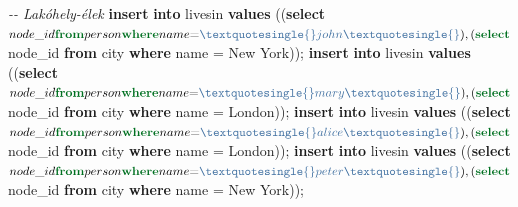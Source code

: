 \documentclass[
  magyar,
]{article}
\newenvironment{Shaded}{}{}
\newcommand{\CommentTok}[1]{\textcolor[rgb]{0.38,0.63,0.69}{\textit{#1}}}
\newcommand{\KeywordTok}[1]{\textcolor[rgb]{0.00,0.44,0.13}{\textbf{#1}}}
\newcommand{\NormalTok}[1]{#1}
\newcommand{\OperatorTok}[1]{\textcolor[rgb]{0.40,0.40,0.40}{#1}}
\newcommand{\StringTok}[1]{\textcolor[rgb]{0.25,0.44,0.63}{#1}}
\begin{document}
\begin{Shaded}
\begin{Highlighting}[]
\CommentTok{{-}{-} Lakóhely{-}élek}
\KeywordTok{insert} \KeywordTok{into}\NormalTok{ livesin }\KeywordTok{values}
\NormalTok{ ((}\KeywordTok{select}\NormalTok{ $node\_id }\KeywordTok{from}\NormalTok{ person }\KeywordTok{where}\NormalTok{ name }\OperatorTok{=} \StringTok{\textquotesingle{}john\textquotesingle{}}\NormalTok{),}
\NormalTok{ (}\KeywordTok{select}\NormalTok{ $node\_id }\KeywordTok{from}\NormalTok{ city }\KeywordTok{where}\NormalTok{ name }\OperatorTok{=} \StringTok{\textquotesingle{}New York\textquotesingle{}}\NormalTok{));}
\KeywordTok{insert} \KeywordTok{into}\NormalTok{ livesin }\KeywordTok{values}
\NormalTok{ ((}\KeywordTok{select}\NormalTok{ $node\_id }\KeywordTok{from}\NormalTok{ person }\KeywordTok{where}\NormalTok{ name }\OperatorTok{=} \StringTok{\textquotesingle{}mary\textquotesingle{}}\NormalTok{),}
\NormalTok{ (}\KeywordTok{select}\NormalTok{ $node\_id }\KeywordTok{from}\NormalTok{ city }\KeywordTok{where}\NormalTok{ name }\OperatorTok{=} \StringTok{\textquotesingle{}London\textquotesingle{}}\NormalTok{));}
\KeywordTok{insert} \KeywordTok{into}\NormalTok{ livesin }\KeywordTok{values}
\NormalTok{ ((}\KeywordTok{select}\NormalTok{ $node\_id }\KeywordTok{from}\NormalTok{ person }\KeywordTok{where}\NormalTok{ name }\OperatorTok{=} \StringTok{\textquotesingle{}alice\textquotesingle{}}\NormalTok{),}
\NormalTok{ (}\KeywordTok{select}\NormalTok{ $node\_id }\KeywordTok{from}\NormalTok{ city }\KeywordTok{where}\NormalTok{ name }\OperatorTok{=} \StringTok{\textquotesingle{}London\textquotesingle{}}\NormalTok{));}
\KeywordTok{insert} \KeywordTok{into}\NormalTok{ livesin }\KeywordTok{values}
\NormalTok{ ((}\KeywordTok{select}\NormalTok{ $node\_id }\KeywordTok{from}\NormalTok{ person }\KeywordTok{where}\NormalTok{ name }\OperatorTok{=} \StringTok{\textquotesingle{}peter\textquotesingle{}}\NormalTok{),}
\NormalTok{ (}\KeywordTok{select}\NormalTok{ $node\_id }\KeywordTok{from}\NormalTok{ city }\KeywordTok{where}\NormalTok{ name }\OperatorTok{=} \StringTok{\textquotesingle{}New York\textquotesingle{}}\NormalTok{));}


\end{Highlighting}
\end{Shaded}
\end{document}
